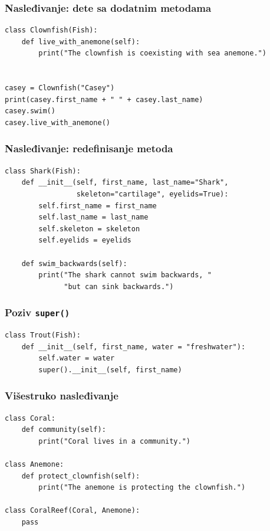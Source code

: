 \documentclass[compress]{beamer}
\begin{document}
\begin{frame}[fragile]
\frametitle{Nasleđivanje: dete sa dodatnim metodama}
\begin{verbatim}
class Clownfish(Fish):
    def live_with_anemone(self):
        print("The clownfish is coexisting with sea anemone.")


casey = Clownfish("Casey")
print(casey.first_name + " " + casey.last_name)
casey.swim()
casey.live_with_anemone()
\end{verbatim}
\end{frame}

\begin{frame}[fragile]
\frametitle{Nasleđivanje: redefinisanje metoda}
\begin{verbatim}
class Shark(Fish):
    def __init__(self, first_name, last_name="Shark",
                 skeleton="cartilage", eyelids=True):
        self.first_name = first_name
        self.last_name = last_name
        self.skeleton = skeleton
        self.eyelids = eyelids

    def swim_backwards(self):
        print("The shark cannot swim backwards, "
              "but can sink backwards.")
\end{verbatim}
\end{frame}

\begin{frame}[fragile]
\frametitle{Poziv \texttt{super()}}
\begin{verbatim}
class Trout(Fish):
    def __init__(self, first_name, water = "freshwater"):
        self.water = water
        super().__init__(self, first_name)
\end{verbatim}
\end{frame}

\begin{frame}[fragile]
\frametitle{Višestruko nasleđivanje}
\begin{verbatim}
class Coral:
    def community(self):
        print("Coral lives in a community.")

class Anemone:
    def protect_clownfish(self):
        print("The anemone is protecting the clownfish.")

class CoralReef(Coral, Anemone):
    pass
\end{verbatim}
\end{frame}
\end{document}

